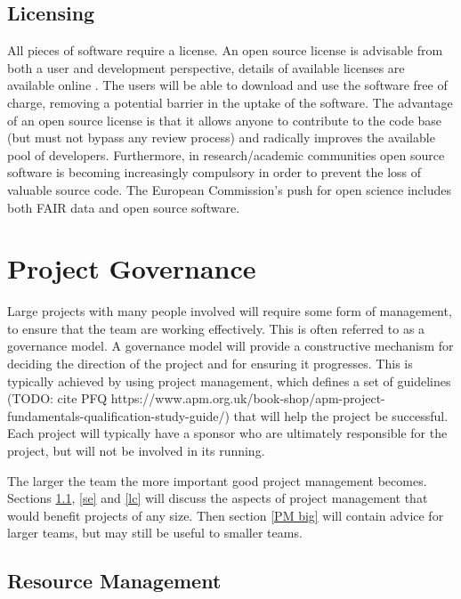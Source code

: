 \documentclass[jnr]{iosart2x}
\begin{document}
\subsection{Licensing}
\label{Licensing}

All pieces of software require a license.
An open source license is advisable from both a user and development perspective, details of available licenses are available online \cite{OSI_Licenses}.
The users will be able to download and use the software free of charge, removing a potential barrier in the uptake of the software.
The advantage of an open source license is that it allows anyone to contribute to the code base (but must not bypass any review process) and radically improves the available pool of developers.
Furthermore, in research/academic communities open source software is becoming increasingly compulsory in order to prevent the loss of valuable source code.
The European Commission's push for open science \cite{EOSC} includes both FAIR data and open source software.

\section{Project Governance}
\label{Project Governance}

Large projects with many people involved will require some form of management, to ensure that the team are working effectively.
This is often referred to as a governance model.
A governance model will provide a constructive mechanism for deciding the direction of the project and for ensuring it progresses.
This is typically achieved by using project management, which defines a set of guidelines (TODO: cite PFQ https://www.apm.org.uk/book-shop/apm-project-fundamentals-qualification-study-guide/) that will help the project be successful.
Each project will typically have a sponsor who are ultimately responsible for the project, but will not be involved in its running.

The larger the team the more important good project management becomes.
Sections \ref{rman}, \ref{se} and \ref{lc} will discuss the aspects of project management that would benefit projects of any size.
Then section \ref{PM big} will contain advice for larger teams, but may still be useful to smaller teams.

\subsection{Resource Management}
\label{rman}
\end{document}
